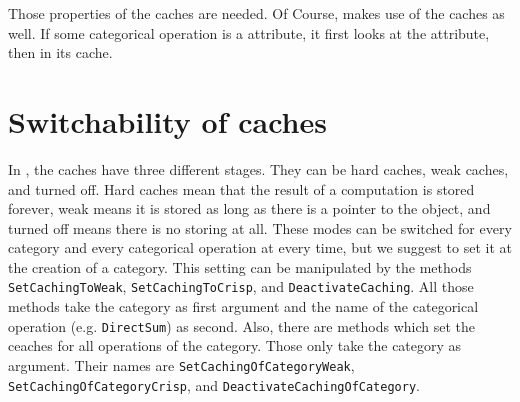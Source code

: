 Those properties of the \CapPkg caches are needed. Of Course, \CapPkg makes use of the \GAP caches as well. If some categorical
operation is a \GAP attribute, it first looks at the \GAP attribute, then in its \CapPkg cache.

\section{Switchability of caches}

In \CapPkg, the caches have three different stages. They can be hard caches, weak caches, and turned off.
Hard caches mean that the result of a computation is stored forever, weak means it is stored as long as
there is a pointer to the object, and turned off means there is no storing at all. These modes can be switched for
every category and every categorical operation at every time, but we suggest to set it at the creation of a category.
This setting can be manipulated by the methods \texttt{SetCachingToWeak}, \texttt{SetCachingToCrisp}, and \texttt{DeactivateCaching}.
All those methods take the category as first argument and the name of the categorical operation (e.g. \texttt{DirectSum}) as second.
Also, there are methods which set the ceaches for all operations of the category. Those only take the category as argument.
Their names are \texttt{SetCachingOfCategoryWeak}, \texttt{SetCachingOfCategoryCrisp}, and \texttt{DeactivateCachingOfCategory}.


